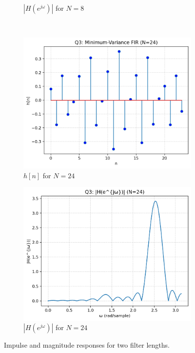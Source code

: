\documentclass[12pt,a4paper]{article}
\begin{document}
\begin{figure}[H]
\begin{subfigure}{0.48\textwidth}
        \caption{$|H(e^{j\omega})|$ for $N=8$}
    \end{subfigure}\\[0.6em]
    \begin{subfigure}{0.48\textwidth}
        \includegraphics[width=\linewidth]{outputs/q3/N24/q3_impulse_N24.png}
        \caption{$h[n]$ for $N=24$}
    \end{subfigure}\hfill
    \begin{subfigure}{0.48\textwidth}
        \includegraphics[width=\linewidth]{outputs/q3/N24/q3_spectrum_N24.png}
        \caption{$|H(e^{j\omega})|$ for $N=24$}
    \end{subfigure}
    \caption{Impulse and magnitude responses for two filter lengths.}
    \label{fig:q3_impulse_spectrum}
\end{figure}
\end{document}
